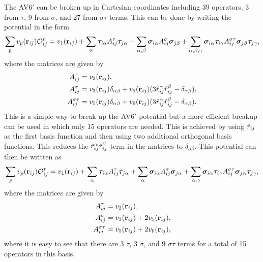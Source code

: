 The AV6$'$ can be broken up in Cartesian coordinates including 39 operators, 3 from $\tau$, 9 from $\sigma$, and 27 from $\sigma\tau$ terms. This can be done by writing the potential in the form
\begin{equation}
   \sum\limits_p v_p(\mathbf{r}_{ij})\mathcal{O}^p_{ij} = v_1(\mathbf{r}_{ij}) + \sum\limits_\alpha \bm{\tau}_{i\alpha}A^\tau_{ij}\bm{\tau}_{j\alpha} + \sum\limits_{\alpha,\beta} \bm{\sigma}_{i\alpha}A^\sigma_{ij}\bm{\sigma}_{j\beta} + \sum\limits_{\alpha,\beta,\gamma} \bm{\sigma}_{i\alpha}\bm{\tau}_{i\gamma}A^{\sigma\tau}_{ij}\bm{\sigma}_{j\beta}\bm{\tau}_{j\gamma},
\end{equation}
where the matrices are given by
\begin{align}
   A^\tau_{ij} &= v_2(\mathbf{r}_{ij}), \\
   A^\sigma_{ij} &= v_3(\mathbf{r}_{ij})\delta_{\alpha\beta} + v_5(\mathbf{r}_{ij})(3\hat{r}_{ij}^\alpha\hat{r}_{ij}^\beta-\delta_{\alpha\beta}), \\
   A^{\sigma\tau}_{ij} &= v_5(\mathbf{r}_{ij})\delta_{\alpha\beta} + v_6(\mathbf{r}_{ij})(3\hat{r}_{ij}^\alpha\hat{r}_{ij}^\beta-\delta_{\alpha\beta}).
\end{align}
This is a simple way to break up the AV6$'$ potential but a more efficient breakup can be used in which only 15 operators are needed. This is achieved by using $\hat{r}_{ij}$ as the first basis function and then using two additional orthogonal basis functions. This reduces the $\hat{r}_{ij}^\alpha\hat{r}_{ij}^\beta$ term in the matrices to $\delta_{\alpha\beta}$. This potential can then be written as
\begin{equation}
   \sum\limits_p v_p(\mathbf{r}_{ij})\mathcal{O}^p_{ij} = v_1(\mathbf{r}_{ij}) + \sum\limits_\alpha \bm{\tau}_{i\alpha}A^\tau_{ij}\bm{\tau}_{j\alpha} + \sum\limits_{\alpha} \bm{\sigma}_{i\alpha}A^\sigma_{ij}\bm{\sigma}_{j\alpha} + \sum\limits_{\alpha,\gamma} \bm{\sigma}_{i\alpha}\bm{\tau}_{i\gamma}A^{\sigma\tau}_{ij}\bm{\sigma}_{j\alpha}\bm{\tau}_{j\gamma},
\end{equation}
where the matrices are given by
\begin{align}
   A^\tau_{ij} &= v_2(\mathbf{r}_{ij}), \\
   A^\sigma_{ij} &= v_3(\mathbf{r}_{ij}) + 2v_5(\mathbf{r}_{ij}), \\
   A^{\sigma\tau}_{ij} &= v_5(\mathbf{r}_{ij}) + 2v_6(\mathbf{r}_{ij}),
\end{align}
where it is easy to see that there are 3 $\tau$, 3 $\sigma$, and 9 $\sigma\tau$ terms for a total of 15 operators in this basis.

